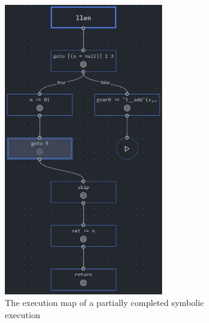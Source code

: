\begin{figure}
  \centering
  \begin{subfigure}[b]{0.4\textwidth}
    \centering
    \includegraphics[width=0.75\textwidth]{img/execmap-init.png}
    \caption{The execution map of a partially completed symbolic execution}%
    \label{fig:execmap-init}
  \end{subfigure}
  \qquad
  \begin{subfigure}[b]{0.4\textwidth}
    \centering

\end{subfigure}
\end{figure}
